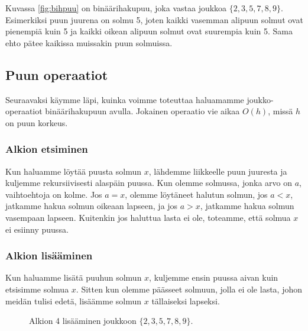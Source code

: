 Kuvassa \ref{fig:bihpuu} on binäärihakupuu,
joka vastaa joukkoa $\{2,3,5,7,8,9\}$.
Esimerkiksi puun juurena on solmu 5,
joten kaikki vasemman alipuun solmut
ovat pienempiä kuin 5 ja kaikki oikean alipuun
solmut ovat suurempia kuin 5.
Sama ehto pätee kaikissa muissakin puun solmuissa.

\subsection{Puun operaatiot}

Seuraavaksi käymme läpi, kuinka voimme toteuttaa
haluamamme joukko-operaatiot
binäärihakupuun avulla.
Jokainen operaatio vie aikaa $O(h)$,
missä $h$ on puun korkeus.

\subsubsection{Alkion etsiminen}

Kun haluamme löytää puusta solmun $x$, lähdemme liikkeelle
puun juuresta ja kuljemme rekursiivisesti alaspäin puussa.
Kun olemme solmussa, jonka arvo on $a$,
vaihtoehtoja on kolme.
Jos $a=x$, olemme löytäneet halutun solmun,
jos $a<x$, jatkamme hakua solmun oikeaan lapseen,
ja jos $a>x$, jatkamme hakua solmun vasempaan lapseen.
Kuitenkin jos haluttua lasta ei ole, toteamme,
että solmua $x$ ei esiinny puussa.

\subsubsection{Alkion lisääminen}

Kun haluamme lisätä puuhun solmun $x$, kuljemme ensin
puussa aivan kuin etsisimme solmua $x$.
Sitten kun olemme päässeet solmuun,
jolla ei ole lasta, johon meidän tulisi edetä,
lisäämme solmun $x$ tällaiseksi lapseksi.

\begin{figure}
\center
{}
\caption{Alkion 4 lisääminen joukkoon $\{2,3,5,7,8,9\}$.}
\label{fig:bihpu2}
\end{figure}

